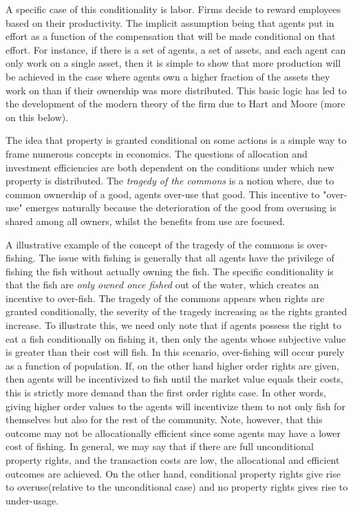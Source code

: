 A specific case of this conditionality is labor. Firms decide to reward employees based on their productivity. The implicit assumption being that agents put in effort as a function of the compensation that will be made conditional on that effort. For instance, if there is a set of agents, a set of assets, and each agent can only work on a single asset, then it is simple to show that more production will be achieved in the case where agents own a higher fraction of the assets they work on than if their ownership was more distributed. This basic logic has led to the development of the modern theory of the firm due to Hart and Moore (more on this below).

The idea that property is granted conditional on some actions is a simple way to frame numerous concepts in economics. The questions of allocation and investment efficiencies are both dependent on the conditions under which new property is distributed. The \textit{tragedy of the commons} is a notion where, due to common ownership of a good, agents over-use that good. This incentive to "over-use" emerges naturally because the deterioration of the good from overusing is shared among all owners, whilst the benefits from use are focused. 

A illustrative example of the concept of the tragedy of the commons is over-fishing. The issue with fishing is generally that all agents have the privilege of fishing the fish without actually owning the fish. The specific conditionality is that the fish are \textit{only owned once fished} out of the water, which creates an incentive to over-fish. The tragedy of the commons appears when rights are granted conditionally, the severity of the tragedy increasing as the rights granted increase. To illustrate this, we need only note that if agents possess the right to eat a fish conditionally on fishing it, then only the agents whose subjective value is greater than their cost will fish. In this scenario, over-fishing will occur purely as a function of population. If, on the other hand higher order rights are given, then agents will be incentivized to fish until the market value equals their costs, this is strictly more demand than the first order rights case. In other words, giving higher order values to the agents will incentivize them to not only fish for themselves but also for the rest of the community. Note, however, that this outcome may not be allocationally efficient since some agents may have a lower cost of fishing. In general, we may say that if there are full unconditional property rights, and the transaction costs are low, the allocational and efficient outcomes are achieved. On the other hand, conditional property rights give rise to overuse(relative to the unconditional case) and no property rights gives rise to under-usage.

